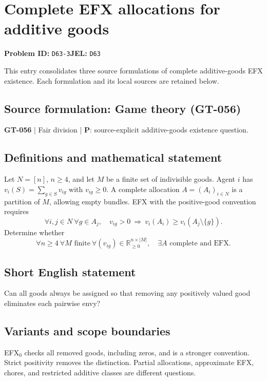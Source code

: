 \documentclass[11pt,a4paper]{article}
\begin{document}
\section*{Complete EFX allocations for additive goods}
\textbf{Problem ID:} \texttt{D63-3}\quad \textbf{JEL:} \texttt{D63}\par
\label{problem:OP-0186}
\label{audited:ECON-001}
This entry consolidates three source formulations of complete additive-goods EFX existence. Each formulation and its local sources are retained below.\par
\subsection*{Source formulation: Game theory (GT-056)}

\label{game:GT-056}
{\sffamily\small\color{muted}
\textbf{GT-056} | Fair division | \textbf{P}: source-explicit additive-goods existence question.
\par}
\subsection*{Definitions and mathematical statement}
Let $N=[n]$, $n\geq4$, and let $M$ be a finite set of indivisible goods. Agent $i$ has $v_i(S)=\sum_{g\in S}v_{ig}$ with $v_{ig}\geq0$. A complete allocation $A=(A_i)_{i\in N}$ is a partition of $M$, allowing empty bundles. EFX with the positive-good convention requires
\[
 \forall i,j\in N\ \forall g\in A_j,
 \quad v_{ig}>0\ \Longrightarrow\
 v_i(A_i)\geq v_i(A_j\setminus\{g\}).
\]
Determine whether
\[
 \forall n\geq4\ \forall M\text{ finite}\ \forall(v_{ig})\in
 \mathbb R_{\geq0}^{n\times|M|},\quad
 \exists A\text{ complete and EFX}.
\]
\subsection*{Short English statement}
Can all goods always be assigned so that removing any positively valued good eliminates each pairwise envy?
\subsection*{Variants and scope boundaries}
EFX$_0$ checks all removed goods, including zeros, and is a stronger convention. Strict positivity removes the distinction. Partial allocations, approximate EFX, chores, and restricted additive classes are different questions.
\end{document}
